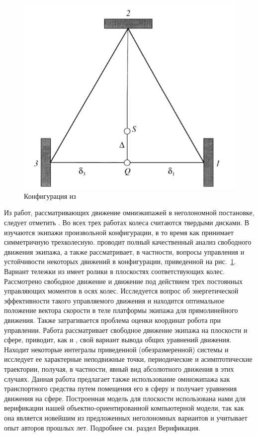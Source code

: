 \documentclass[12pt]{article}
\begin{document}
\begin{figure}
\hspace{5pt}
\begin{minipage}{.47\textwidth}
    \centering
    \includegraphics[width=\textwidth]{content/parts/3_friction/diploma/img/art/zobova.png}
    \caption{Конфигурация из \cite{kos4}}
    \label{fig:zobova}
\end{minipage}
\end{figure}

Из работ, рассматривающих движение омниэкипажей в неголономной постановке, следует отметить \cite{kos4,formalskii,borisov}. Во всех трех работах колеса считаются твердыми дисками. В \cite{kos4,borisov} изучаются экипажи произвольной конфигурации, в то время как \cite{formalskii} принимает симметричную трехколесную. \cite{kos4} проводит полный качественный анализ свободного движения экипажа, а также рассматривает, в частности, вопросы управления и устойчивости некоторых движений в конфигурации, приведенной на рис.~\ref{fig:zobova}. Вариант тележки из \cite{formalskii} имеет ролики в плоскостях соответствующих колес. Рассмотрено свободное движение и движение под действием трех постоянных управляющих моментов в осях колес. Исследуется вопрос об энергетической эффективности такого управляемого движения и находится оптимальное положение вектора скорости в теле платформы экипажа для прямолинейного движения. Также затрагивается проблема оценки координат робота при управлении. Работа\cite{borisov} рассматривает свободное движение экипажа на плоскости и сфере, приводит, как и \cite{kos4}, свой вариант вывода общих уравнений движения. Находит некоторые интегралы приведенной (обезразмеренной) системы и исследует ее характерные неподвижные точки, периодические и асимптотические траектории, получая, в частности, явный вид абсолютного движения в этих случаях. Данная работа предлагает также использование омниэкипажа как транспортного средства путем помещения его в сферу и получает уравнения движения на сфере. Построенная модель для плоскости использована нами для верификации нашей объектно-ориентированной компьютерной модели, так как она является новейшим из предложенных неголономных вариантов и учитывает опыт авторов прошлых лет. Подробнее см. раздел Верификация.\\
\end{document}
